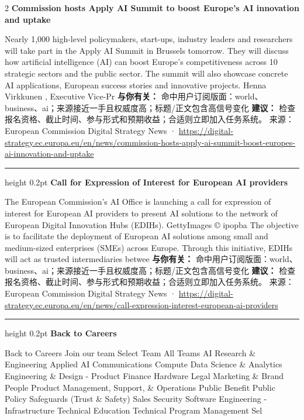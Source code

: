 \documentclass[10.5pt]{ctexart}
\begin{document}
\begin{multicols}{2}
{\large\bfseries Commission hosts Apply AI Summit to boost Europe’s AI innovation and uptake}\par
Nearly 1,000 high-level policymakers, start-ups, industry leaders and researchers will take part in the Apply AI Summit in Brussels tomorrow. They will discuss how artificial intelligence (AI) can boost Europe’s competitiveness across 10 strategic sectors and the public sector. The summit will also showcase concrete AI applications, European success stories and innovative projects. Henna Virkkunen , Executive Vice-Pr
\textbf{与你有关：} 命中用户订阅版面：world、business、ai；来源接近一手且权威度高；标题/正文包含高信号变化
\textbf{建议：} 检查报名资格、截止时间、参与形式和预期收益；合适则立即加入任务系统。
{\footnotesize\color{ormuted} 来源：European Commission Digital Strategy News · \url{https://digital-strategy.ec.europa.eu/en/news/commission-hosts-apply-ai-summit-boost-europes-ai-innovation-and-uptake}}
\vspace{2mm}
\hrule height 0.2pt
\vspace{2mm}
{\large\bfseries Call for Expression of Interest for European AI providers}\par
The European Commission’s AI Office is launching a call for expression of interest for European AI providers to present AI solutions to the network of European Digital Innovation Hubs (EDIHs). GettyImages © ipopba The objective is to facilitate the deployment of European AI solutions among small and medium-sized enterprises (SMEs) across Europe. Through this initiative, EDIHs will act as trusted intermediaries betwee
\textbf{与你有关：} 命中用户订阅版面：world、business、ai；来源接近一手且权威度高；标题/正文包含高信号变化
\textbf{建议：} 检查报名资格、截止时间、参与形式和预期收益；合适则立即加入任务系统。
{\footnotesize\color{ormuted} 来源：European Commission Digital Strategy News · \url{https://digital-strategy.ec.europa.eu/en/news/call-expression-interest-european-ai-providers}}
\vspace{2mm}
\hrule height 0.2pt
\vspace{2mm}
{\large\bfseries Back to Careers}\par
Back to Careers Join our team Select Team All Teams AI Research \& Engineering Applied AI Communications Compute Data Science \& Analytics Engineering \& Design - Product Finance Hardware Legal Marketing \& Brand People Product Management, Support, \& Operations Public Benefit Public Policy Safeguards (Trust \& Safety) Sales Security Software Engineering - Infrastructure Technical Education Technical Program Management Sel

\end{multicols}
\end{document}
